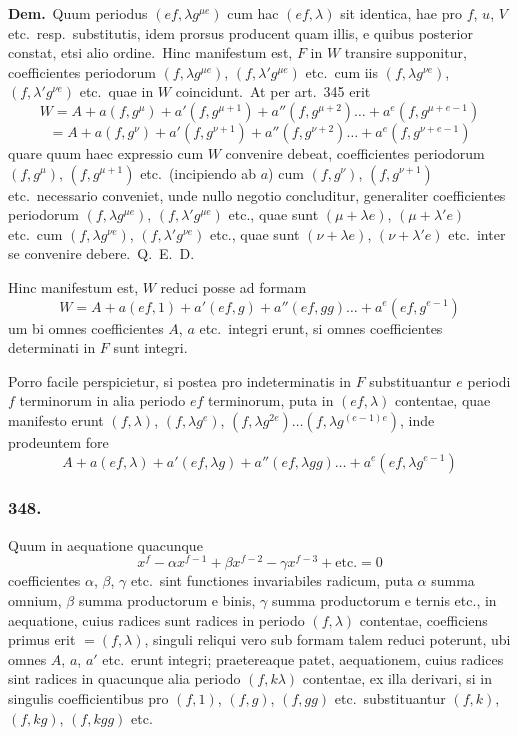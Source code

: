 \documentclass[12pt,a4paper]{article}
\theoremstyle{plain}
\theoremstyle{definition}
\theoremstyle{remark}
\begin{document}
\textbf{Dem.}\ Quum periodus $(ef,\lambda g^{\mu e})$ cum hac $(ef,\lambda)$ sit identica,
hae pro $f$, $u$, $V$ etc.\ resp.\ substitutis, idem prorsus producent quam
illis, e quibus posterior constat, etsi alio ordine.\ Hinc manifestum est,
$F$ in $W$ transire supponitur, coefficientes periodorum $(f,\lambda g^{\mu e})$,
$(f,\lambda' g^{\mu e})$ etc.\ cum iis $(f,\lambda g^{\nu e})$, $(f,\lambda' g^{\nu e})$ etc.\ quae in $W$
coincidunt.\ At per art.\ 345 erit
\[W = A+a(f,g^\mu)+a'(f,g^{\mu+1})+a''(f,g^{\mu+2})\dots+a^e(f,g^{\mu+e-1})\]
\[= A+a(f,g^\nu)+a'(f,g^{\nu+1})+a''(f,g^{\nu+2})\dots+a^e(f,g^{\nu+e-1})\]
quare quum haec expressio cum $W$ convenire debeat, coefficientes periodorum
$(f,g^{\mu})$, $(f,g^{\mu+1})$ etc.\ (incipiendo ab $a$) cum $(f,g^{\nu})$,
$(f,g^{\nu+1})$ etc.\ necessario conveniet, unde nullo negotio concluditur,
generaliter coefficientes periodorum $(f,\lambda g^{\mu e})$, $(f,\lambda' g^{\mu e})$ etc.,
quae sunt $(\mu+\lambda e)$, $(\mu+\lambda' e)$ etc.\ cum $(f,\lambda g^{\nu e})$,
$(f,\lambda' g^{\nu e})$ etc., quae sunt $(\nu+\lambda e)$, $(\nu+\lambda' e)$ etc.\ inter se
convenire debere.\ Q.\ E.\ D.

Hinc manifestum est, $W$ reduci posse ad formam
\[W = A+a(ef,1)+a'(ef,g)+a''(ef,gg)\dots+a^e(ef,g^{e-1})\]
um bi omnes coefficientes $A$, $a$ etc.\ integri erunt, si omnes coefficientes
determinati in $F$ sunt integri.

Porro facile perspicietur, si postea pro indeterminatis in $F$ substituantur
$e$ periodi $f$ terminorum in alia periodo $ef$ terminorum, puta in
$(ef,\lambda)$ contentae, quae manifesto erunt $(f,\lambda)$, $(f,\lambda g^e)$,
$(f,\lambda g^{2e})\dots(f,\lambda g^{(e-1)e})$, inde prodeuntem fore
\[A+a(ef,\lambda)+a'(ef,\lambda g)+a''(ef,\lambda gg)\dots+a^e(ef,\lambda g^{e-1})\]

\subsubsection*{348.}

Quum in aequatione quacunque
\[x^f-\alpha x^{f-1}+\beta x^{f-2}-\gamma x^{f-3}+\text{etc.} = 0\]
coefficientes $\alpha$, $\beta$, $\gamma$ etc.\ sint functiones invariabiles radicum, puta
$\alpha$ summa omnium, $\beta$ summa productorum e binis, $\gamma$ summa
productorum e ternis etc., in aequatione, cuius radices sunt radices in
periodo $(f,\lambda)$ contentae, coefficiens primus erit $=(f,\lambda)$, singuli
reliqui vero sub formam talem reduci poterunt, ubi omnes $A$, $a$,
$a'$ etc.\ erunt integri; praetereaque patet, aequationem, cuius radices sint
radices in quacunque alia periodo $(f,k\lambda)$ contentae, ex illa derivari, si
in singulis coefficientibus pro $(f,1)$, $(f,g)$, $(f,gg)$ etc.\ substituantur
$(f,k)$, $(f,kg)$, $(f,kgg)$ etc.
\end{document}
